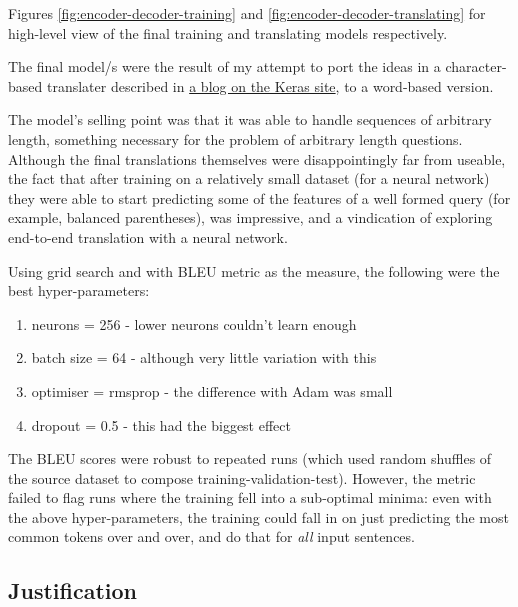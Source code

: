 \documentclass[12pt]{article}
\begin{document}
Figures \ref{fig:encoder-decoder-training} and 
\ref{fig:encoder-decoder-translating} for high-level view of the final training
and translating models respectively.

The final model/s were the result of my attempt to port the ideas in 
a character-based translater described in 
\href{https://blog.keras.io/a-ten-minute-introduction-to-sequence-to-sequence-learning-in-keras.html}{a blog on the Keras site},
to a word-based version.

The model's selling point was that it was able to handle sequences of
arbitrary length, something necessary for the problem of arbitrary length
questions. Although the final translations themselves were disappointingly 
far from useable, the fact that after training on a relatively small 
dataset (for a neural network) they were able to start predicting some
of the features of a well formed query (for example, balanced parentheses),
was impressive, and a vindication of exploring end-to-end translation with
a neural network.

Using grid search and with BLEU metric as the measure, the following were 
the best hyper-parameters:

\begin{enumerate}
  \item neurons = 256 - lower neurons couldn't learn enough
  \item batch size = 64 - although very little variation with this
  \item optimiser = rmsprop - the difference with Adam was small
  \item dropout = 0.5 - this had the biggest effect
\end{enumerate}

The BLEU scores were robust to repeated runs (which used random shuffles
of the source dataset to compose training-validation-test). However,
the metric failed to flag runs where the training fell into a sub-optimal
minima: even with the above hyper-parameters, the training could fall
in on just predicting the most common tokens over and over, and do that
for \textit{all} input sentences.

\subsection{Justification}\label{justification}
\end{document}
